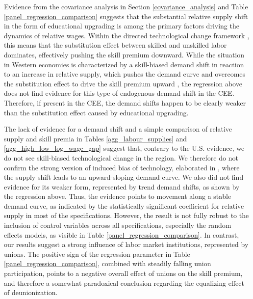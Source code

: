 \documentclass[11pt]{article}
\begin{document}
Evidence from the covariance analysis in Section \ref{covariance_analysis} and Table \ref{panel_regression_comparison} suggests that the substantial relative supply shift in the form of educational upgrading is among the primary factors driving the dynamics of relative wages. Within the directed technological change framework \citep{acemoglu2002directed}, this means that the substitution effect between skilled and unskilled labor dominates, effectively pushing the skill premium downward. While the situation in Western economies is characterized by a skill-biased demand shift in reaction to an increase in relative supply, which pushes the demand curve and overcomes the substitution effect to drive the skill premium upward \citep{acemoglu2002directed}, the regression above does not find evidence for this type of endogenous demand shift in the CEE. Therefore, if present in the CEE, the demand shifts happen to be clearly weaker than the substitution effect caused by educational upgrading.

The lack of evidence for a demand shift and a simple comparison of relative supply and skill premia in Tables \ref{agg_labour_supplies} and \ref{agg_high_low_log_wage_gap} suggest that, contrary to the U.S. evidence, we do not see skill-biased technological change in the region. We therefore do not confirm the strong version of induced bias of technology, elaborated in \cite{acemoglu2002directed}, where the supply shift leads to an upward-sloping demand curve. We also did not find evidence for its weaker form, represented by trend demand shifts, as shown by the regression above. Thus, the evidence points to movement along a stable demand curve, as indicated by the statistically significant coefficient for relative supply in most of the specifications. However, the result is not fully robust to the inclusion of control variables across all specifications, especially the random effects models, as visible in Table \ref{panel_regression_comparison}. In contrast, our results suggest a strong influence of labor market institutions, represented by unions. The positive sign of the regression parameter in Table \ref{panel_regression_comparison}, combined with steadily falling union participation, points to a negative overall effect of unions on the skill premium, and therefore a somewhat paradoxical conclusion regarding the equalizing effect of deunionization.
\end{document}
